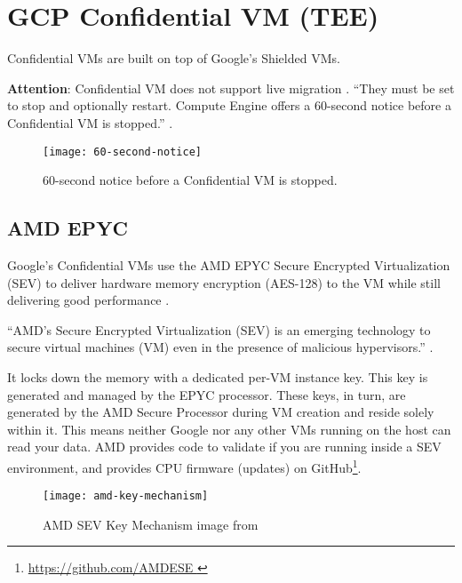 
\section*{GCP Confidential VM (TEE)}


Confidential VMs are built on top of Google's Shielded VMs. 

\textbf{Attention}: Confidential VM does not support live migration 
\citep{google_creating_2022}. 
“They must be set to stop and optionally restart. 
Compute Engine offers a 60-second notice before a Confidential VM is stopped.” 
\citep{google_live_2022}.

\begin{figure}[!ht]
    \centering
    \texttt{[image: 60-second-notice]}
    \caption{60-second notice before a Confidential VM is stopped.}
    \label{fig:60-second-notice}
\end{figure}

\subsection*{AMD EPYC} 
Google's Confidential VMs use the AMD EPYC Secure Encrypted Virtualization (SEV) 
to deliver hardware memory encryption (AES-128) to the VM 
while still delivering good performance \citep{amd_amd_2022, amd_secure_2019}. 

“AMD’s Secure Encrypted Virtualization (SEV) is an emerging technology to secure virtual machines (VM) 
even in the presence of malicious hypervisors.” \citep{li_exploiting_2019}.

It locks down the memory with a dedicated per-VM instance key. 
This key is generated and managed by the EPYC processor. 
These keys, in turn, are generated by the AMD Secure Processor during VM creation and reside solely within it.
This means neither Google nor any other VMs running on the host can read your data. 
AMD provides code to validate if you are running inside a SEV environment, 
and provides CPU firmware (updates) on GitHub\footnote{\url{https://github.com/AMDESE }}.

\begin{figure}[!ht]
    \centering
    \texttt{[image: amd-key-mechanism]}
    \caption{AMD SEV Key Mechanism image from \cite{amd_amd_2020}}
    \label{fig:amd-key-mechanism}
\end{figure}




